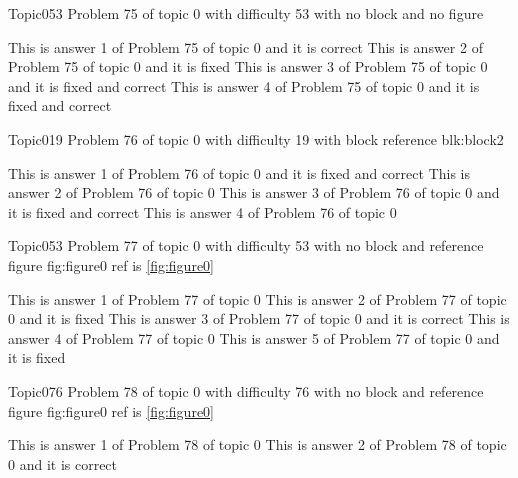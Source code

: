 \documentclass[master]{exam}
\begin{document}
\begin{problem}{Topic0}{53}
	Problem 75 of topic 0 with difficulty 53 with no block and no figure
	\begin{answers}
		\answer[correct] This is answer 1 of Problem 75 of topic 0 and it is correct
		\answer[fixed] This is answer 2 of Problem 75 of topic 0 and it is fixed
		 This is answer 3 of Problem 75 of topic 0 and it is fixed and correct
		 This is answer 4 of Problem 75 of topic 0 and it is fixed and correct
	\end{answers}
\end{problem}

\begin{problem}[requires=blk:block2]{Topic0}{19}
	Problem 76 of topic 0 with difficulty 19 with block reference blk:block2
	\begin{answers}
		 This is answer 1 of Problem 76 of topic 0 and it is fixed and correct
		\answer This is answer 2 of Problem 76 of topic 0 
		 This is answer 3 of Problem 76 of topic 0 and it is fixed and correct
		\answer This is answer 4 of Problem 76 of topic 0 
	\end{answers}
\end{problem}

\begin{problem}{Topic0}{53}
	Problem 77 of topic 0 with difficulty 53 with no block and reference figure fig:figure0 ref is \ref{fig:figure0}
	\begin{answers}
		\answer This is answer 1 of Problem 77 of topic 0 
		\answer[fixed] This is answer 2 of Problem 77 of topic 0 and it is fixed
		\answer[correct] This is answer 3 of Problem 77 of topic 0 and it is correct
		\answer This is answer 4 of Problem 77 of topic 0 
		\answer[fixed] This is answer 5 of Problem 77 of topic 0 and it is fixed
	\end{answers}
\end{problem}

\begin{problem}{Topic0}{76}
	Problem 78 of topic 0 with difficulty 76 with no block and reference figure fig:figure0 ref is \ref{fig:figure0}
	\begin{answers}
		\answer This is answer 1 of Problem 78 of topic 0 
		\answer[correct] This is answer 2 of Problem 78 of topic 0 and it is correct
	\end{answers}
\end{problem}
\end{document}
